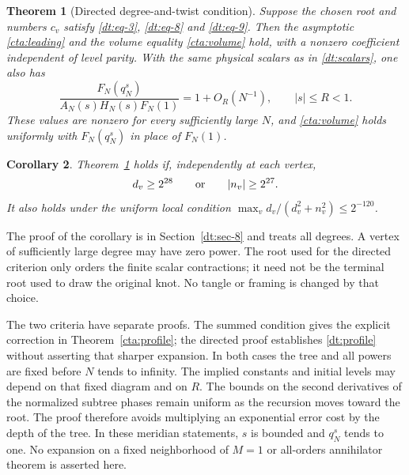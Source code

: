 \documentclass[11pt]{article}
\numberwithin{equation}{section}
\newtheorem{theorem}{Theorem}[section]
\newtheorem{corollary}[theorem]{Corollary}
\theoremstyle{definition}\newtheorem{definition}[theorem]{Definition}
\theoremstyle{remark}\newtheorem{remark}[theorem]{Remark}
\begin{document}
\begin{theorem}[Directed degree-and-twist condition]\label{dt:main}
Suppose the chosen root and numbers \(c_v\) satisfy
\eqref{dt:eq-3}, \eqref{dt:eq-8} and \eqref{dt:eq-9}.
Then the asymptotic \eqref{cta:leading} and the volume equality
\eqref{cta:volume} hold, with a nonzero coefficient independent of
level parity. With the same physical scalars as in \eqref{dt:scalars},
one also has
\begin{equation}\label{dt:profile}
 \frac{F_N(q_N^s)}{A_N(s)H_N(s)F_N(1)}=1+O_R(N^{-1}),
 \qquad |s|\le R<1.
\end{equation}
These values are nonzero for every sufficiently large \(N\), and
\eqref{cta:volume} holds uniformly with \(F_N(q_N^s)\) in place
of \(F_N(1)\).
\end{theorem}

\begin{corollary}\label{dt:mixed}
Theorem~\ref{dt:main} holds if, independently at each vertex,
\[
 d_v\ge2^{28}\qquad\hbox{or}\qquad |n_v|\ge2^{27}.
\]
It also holds under the uniform local condition
\(\max_v d_v/(d_v^2+n_v^2)\le2^{-120}\).
\end{corollary}

The proof of the corollary is in Section~\ref{dt:sec-8} and treats
all degrees. A vertex of sufficiently large degree may have zero
power. The root used for the directed criterion only orders the
finite scalar contractions; it need not be the terminal root used
to draw the original knot. No tangle or framing is changed by that
choice.

The two criteria have separate proofs. The summed condition gives the
explicit correction in Theorem~\ref{cta:profile}; the directed proof
establishes \eqref{dt:profile} without asserting that sharper expansion.
In both cases the tree and all powers are fixed before \(N\) tends
to infinity. The implied constants and initial levels may depend on
that fixed diagram and on \(R\). The bounds on the second derivatives of the normalized subtree
phases remain uniform as the recursion moves toward the root. The
proof therefore avoids multiplying an exponential error cost by the
depth of the tree.
In these meridian statements, \(s\) is bounded and
\(q_N^s\) tends to one. No expansion on a fixed neighborhood of
\(M=1\) or all-orders annihilator theorem is asserted here.
\end{document}
